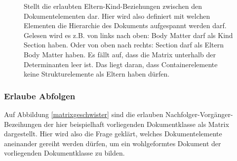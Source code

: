  
\begin{figure}[h!]
\centering
\advance\leftskip-2.5cm
\caption[Matrix über Eltern-Kind-Beziehungen]{ Stellt die erlaubten Eltern-Kind-Beziehungen zwischen den Dokumentelementen dar. Hier wird also definiert mit welchen Elementen die Hierarchie des Dokuments aufgespannt werden darf. Gelesen wird es z.B. von links nach oben: Body Matter darf als Kind Section haben. Oder von oben nach rechts: Section darf als Eltern Body Matter haben. Es fällt auf, dass die Matrix unterhalb der Determinanten leer ist. Das liegt daran, dass Containerelemente keine Strukturelemente als Eltern haben dürfen. }\label{matrixkind}
\end{figure}
 
\subsubsection{Erlaube Abfolgen}\label{}

 
Auf Abbildung \ref{matrixgeschwister} sind die erlauben Nachfolger-Vorgänger-Bezeihungen der hier beispielhaft vorliegenden Dokumentklasse als Matrix dargestellt. Hier wird also die Frage geklärt, welches Dokumentelemente aneinander gereiht werden dürfen, um ein wohlgeformtes Dokument der vorliegenden Dokumentklasse zu bilden.

